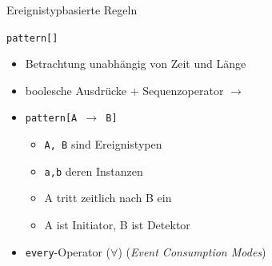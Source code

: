 \documentclass{beamer}
\begin{document}
\begin{frame}{Ereignistypbasierte Regeln}


\begin{block}{\centering \texttt{pattern[]}}
    \begin{itemize}
        \item Betrachtung unabhängig von Zeit und Länge
        \vspace{0.2cm}
        \item boolesche Ausdrücke + Sequenzoperator $\rightarrow$
        \vspace{0.2cm}
        \item \texttt{pattern[A $\rightarrow$ B]}
        \begin{itemize}
            \item \texttt{A, B} sind Ereignistypen
            \item \texttt{a,b} deren Instanzen
            \item A tritt zeitlich nach B ein
            \item A ist Initiator, B ist Detektor 
        \end{itemize}
    \vspace{0.2cm}
        \item \texttt{every}-Operator ($\forall$) (\textit{Event Consumption Modes})
    \end{itemize}
\end{block}

\end{frame}
\end{document}
